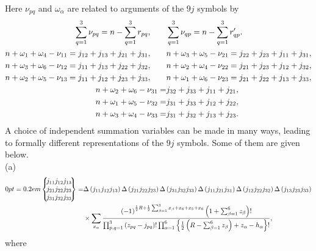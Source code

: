 Here $\nu_{p q}$ and $\omega_{\alpha}$ are related to arguments of the $9 j$ symbols by
\begin{align}
\sum_{q=1}^{3} \nu_{p q}=n-\sum_{q=1}^{3} r_{p q}, \qquad& \sum_{q=1}^{3} \nu_{q p}=n-\sum_{q=1}^{3} r_{q p}^{\prime} . \\
n+\omega_{1}+\omega_{4}-\nu_{11}=j_{12}+j_{13}+j_{21}+j_{31}, \qquad& n+\omega_{3}+\omega_{5}-\nu_{21}=j_{22}+j_{23}+j_{11}+j_{31},\notag \\
n+\omega_{3}+\omega_{6}-\nu_{12}=j_{11}+j_{13}+j_{22}+j_{32}, \qquad& n+\omega_{2}+\omega_{4}-\nu_{22}=j_{21}+j_{23}+j_{12}+j_{32}, \notag\\
n+\omega_{2}+\omega_{5}-\nu_{13}=j_{11}+j_{12}+j_{23}+j_{33}, \qquad& n+\omega_{1}+\omega_{6}-\nu_{23}=j_{21}+j_{22}+j_{13}+j_{33},  \label{eq:10:2:6}\\
n+\omega_{2}+\omega_{6}-\nu_{31}=&j_{32}+j_{33}+j_{11}+j_{21}, \notag\\
n+\omega_{1}+\omega_{5}-\nu_{32}=&j_{31}+j_{33}+j_{12}+j_{22}, \notag\\
n+\omega_{3}+\omega_{4}-\nu_{33}=&j_{31}+j_{32}+j_{13}+j_{23} . \notag
\end{align}
A choice of independent summation variables can be made in many ways, leading to formally different representations of the $9 j$ symbols. Some of them are given below.\\
(a)
\begin{align}
\ninej{j_{11}}{j_{12}}{j_{13}}{j_{21}}{j_{22}}{j_{23}}{j_{31}}{j_{32}}{j_{33}}= & \Delta\left(j_{11} j_{12} j_{13}\right) \Delta\left(j_{21} j_{22} j_{23}\right) \Delta\left(j_{31} j_{32} j_{33}\right) \Delta\left(j_{11} j_{21} j_{31}\right) \Delta\left(j_{12} j_{22} j_{32}\right) \Delta\left(j_{13} j_{23} j_{33}\right)  \notag\\
& \times \sum_{x_{\alpha}} \frac{(-1)^{\frac{1}{2} R+\frac{1}{2} \sum_{\beta=1}^{3} x_{\beta}+x_{6}+x_{5}+x_{6}}\left(1+\sum_{\beta=1}^{6} z_{\beta}\right)!}{\prod_{p, q=1}^{3}\left(z_{p q}-j_{p q}\right)!\prod_{\alpha=1}^{6}\left\{\frac{1}{2}\left(R-\sum_{\beta=1}^{6} z_{\beta}\right)+z_{\alpha}-h_{\alpha}\right\}!}, \label{eq:10:2:7}
\end{align}
where
